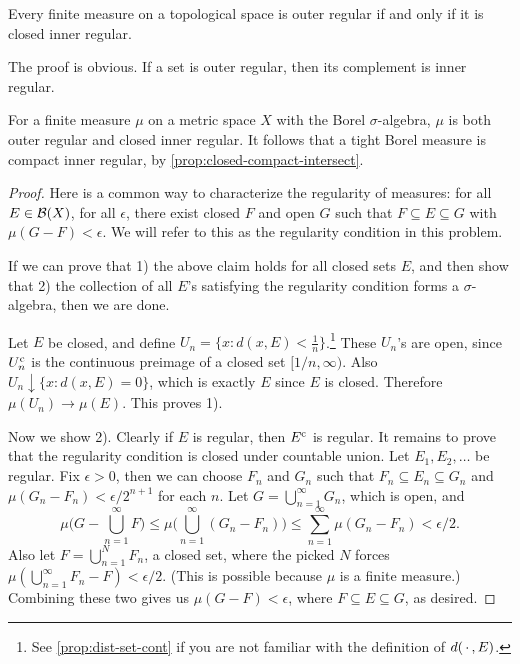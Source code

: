 \begin{prop}
    Every finite measure on a topological space is outer regular if and only if it is closed inner regular.
\end{prop}

The proof is obvious. If a set is outer regular, then its complement is inner regular.

\begin{thm}
    For a finite measure $\mu$ on a metric space $X$ with the Borel $\sigma$-algebra, $\mu$ is both outer regular and closed inner regular. It follows that a tight Borel measure is compact inner regular, by \cref{prop:closed-compact-intersect}.
\end{thm}
\begin{proof}
    Here is a common way to characterize the regularity of measures: for all $E\in \mathcal{B}(X)$, for all $\epsilon$, there exist closed $F$ and open $G$ such that $F\subseteq E \subseteq G$ with $\mu(G - F) < \epsilon$. We will refer to this as the regularity condition in this problem.

    If we can prove that 1) the above claim holds for all closed sets $E$, and then show that 2) the collection of all $E$'s satisfying the regularity condition forms a $\sigma$-algebra, then we are done.

    Let $E$ be closed, and define $U_n = \{x : d(x,E) < \frac{1}{n}\}$.\footnote{See \cref{prop:dist-set-cont} if you are not familiar with the definition of $d(\,\cdot\,,E)$.} These $U_n$'s are open, since $U_n^{\mathrm{c}}$ is the continuous preimage of a closed set $[1/n,\infty)$. Also $U_n \downarrow \{x : d(x,E) = 0 \}$, which is exactly $E$ since $E$ is closed. Therefore $\mu(U_n) \to \mu(E)$. This proves 1).

    Now we show 2). Clearly if $E$ is regular, then $E^{\mathrm{c}}$ is regular. It remains to prove that the regularity condition is closed under countable union. Let $E_1,E_2,\dotsc$ be regular. Fix $\epsilon > 0$, then we can choose $F_n$ and $G_n$ such that $F_n \subseteq E_n \subseteq G_n$ and $\mu(G_n - F_n) < \epsilon/2^{n+1}$ for each $n$. Let $G = \bigcup_{n=1}^\infty G_n$, which is open, and \[\mu\biggl(G - \bigcup_{n=1}^\infty F\biggr) \leq \mu\biggl(\bigcup_{n=1}^\infty (G_n - F_n)\biggr) \leq \sum_{n=1}^\infty \mu(G_n -F_n) < \epsilon / 2.\] Also let $F = \bigcup_{n=1}^N F_n$, a closed set, where the picked $N$ forces $\mu(\bigcup_{n=1}^\infty F_n - F) < \epsilon/2$. (This is possible because $\mu$ is a finite measure.) Combining these two gives us $\mu(G - F) < \epsilon$, where $F \subseteq E \subseteq G$, as desired.
\end{proof}

